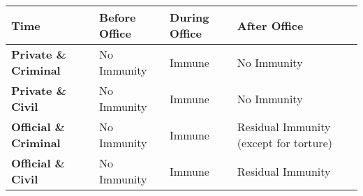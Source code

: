 \begin{table}[H]
    \centering
    \begin{tabular}{|>{\raggedright\arraybackslash}p{}|>{\raggedright\arraybackslash}p{}|>{\raggedright\arraybackslash}p{}|>{\raggedright\arraybackslash}p{}|}
        \hline
        \textbf{Time} & \textbf{Before Office} & \textbf{During Office} & \textbf{After Office} \\\hline
        \textbf{Private \& Criminal} & No Immunity & Immune & No Immunity \\\hline
        \textbf{Private \& Civil} & No Immunity & Immune & No Immunity \\\hline
        \textbf{Official \& Criminal} & No Immunity & Immune & Residual Immunity (except for torture)\\\hline
        \textbf{Official \& Civil} & No Immunity & Immune & Residual Immunity\\\hline
    \end{tabular}
\end{table}

